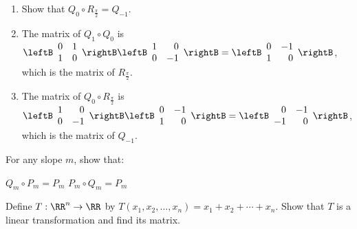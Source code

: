\begin{multicols}{2}
\begin{ex}
\begin{enumerate}[label={\alph*.}]
\item Show that $Q_{0} \circ R_{\frac{\pi}{2}} = Q_{-1}$.

\end{enumerate}
\begin{sol}
\begin{enumerate}[label={\alph*.}]
\setcounter{enumi}{1}
\item  The matrix of $Q_{1} \circ Q_{0}$
 is $\leftB \begin{array}{rr}
 0 & 1 \\
 1 & 0
 \end{array} \rightB \leftB \begin{array}{rr}
 1 & 0 \\
 0 & -1
 \end{array} \rightB = \leftB \begin{array}{rr}
 0 & -1 \\
 1 & 0
 \end{array} \rightB$,
 which is the matrix of $R_{\frac{\pi}{2}}$.

\setcounter{enumi}{3}
\item  The matrix of $Q_{0} \circ R_{\frac{\pi}{2}}$
 is \\ $\leftB \begin{array}{rr}
 1 & 0 \\
 0 & -1
 \end{array} \rightB \leftB \begin{array}{rr}
 0 & -1 \\
 1 & 0
 \end{array} \rightB = \leftB \begin{array}{rr}
 0 & -1 \\
 -1 & 0
 \end{array} \rightB$,
 which is the matrix of $Q_{-1}$.

\end{enumerate}
\end{sol}
\end{ex}

\begin{ex}
For any slope $m$, show that:
\begin{exenumerate}
\exitem $Q_{m} \circ P_{m} = P_{m}$
\exitem $P_{m} \circ Q_{m} = P_{m}$
\end{exenumerate}
\end{ex}

\begin{ex}
Define $T : \RR^n \to \RR$ by $T(x_{1}, x_{2}, \dots, x_{n}) = x_{1} + x_{2} + \cdots + x_{n}$. Show that $T$ is a linear transformation and find its matrix.


\end{ex}
\end{multicols}
